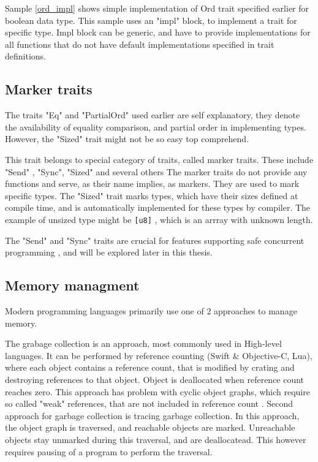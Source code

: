 Sample \ref{ord_impl} shows simple implementation of Ord trait specified earlier for boolean data type. This sample
uses an "impl" block, to implement a trait for specific type. Impl block can be generic, and have to provide
implementations for all functions that do not have default implementations specified in trait definitions.

\subsection{Marker traits}
The traits "Eq" and "PartialOrd" used earlier are self explanatory, they denote the availability of equality comparison, and partial order
in implementing types. However, the "Sized" trait might not be so easy top comprehend.

This trait belongs to special category of traits, called marker traits. These include "Send" , "Sync", "Sized" and several others
The marker traits do not provide any functions and serve, as their name implies, as markers. They are used to mark specific
types. The "Sized" trait marks types, which have their sizes defined at compile time, and is automatically implemented
for these types by compiler. The example of unsized type might be \verb|[u8]| , which is an arrray with unknown length.

The "Send" and "Sync" traits are crucial for features supporting safe concurrent programming , and will be explored later in
this thesis.
\subsection{Memory managment}
Modern programming languages primarily use one of 2 approaches to manage memory.

The grabage collection is an approach, most commonly used in High-level languages. It can be performed
by reference counting (Swift \& Objective-C, Lua), where each object contains a reference count, that is modified
by crating and destroying references to that object. Object is deallocated when reference  count reaches zero.
This approach has problem with cyclic object graphs, which require so called "weak" references, that are
not included in reference count . Second approach for garbage collection is tracing garbage collection.
In this approach, the object graph is traversed, and reachable objects are marked. Unreachable objects stay unmarked during
this traversal, and are deallocatead. This however requires pausing of a program to perform the traversal.

